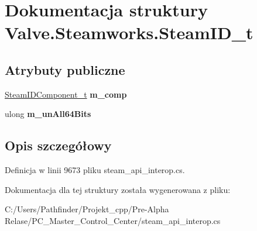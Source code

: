 \hypertarget{struct_valve_1_1_steamworks_1_1_steam_i_d__t}{}\section{Dokumentacja struktury Valve.\+Steamworks.\+Steam\+I\+D\+\_\+t}
\label{struct_valve_1_1_steamworks_1_1_steam_i_d__t}
\subsection*{Atrybuty publiczne}
\begin{DoxyCompactItemize}
\item 
\mbox{\label{struct_valve_1_1_steamworks_1_1_steam_i_d__t_a8f3937cb155cbf56466153f49f85ad54}} 
\hyperlink{struct_valve_1_1_steamworks_1_1_steam_i_d_component__t}{Steam\+I\+D\+Component\+\_\+t} {\bfseries m\+\_\+comp}
\item 
\mbox{\label{struct_valve_1_1_steamworks_1_1_steam_i_d__t_a8487ade5ab37425fa36103e8fabd1035}} 
ulong {\bfseries m\+\_\+un\+All64\+Bits}
\end{DoxyCompactItemize}


\subsection{Opis szczegółowy}


Definicja w linii 9673 pliku steam\+\_\+api\+\_\+interop.\+cs.



Dokumentacja dla tej struktury została wygenerowana z pliku\+:\begin{DoxyCompactItemize}
\item 
C\+:/\+Users/\+Pathfinder/\+Projekt\+\_\+cpp/\+Pre-\/\+Alpha Relase/\+P\+C\+\_\+\+Master\+\_\+\+Control\+\_\+\+Center/steam\+\_\+api\+\_\+interop.\+cs\end{DoxyCompactItemize}
